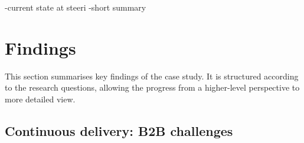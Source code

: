 \documentclass[english]{tktltiki2}
\theoremstyle{definition}
\theoremstyle{remark}
\begin{document}
-current state at steeri
    -short summary


\section{Findings}
This section summarises key findings of the case study. It is structured according to the research questions, allowing the progress from a higher-level perspective to more detailed view. 


%




\subsection{Continuous delivery: B2B challenges}


\end{document}
